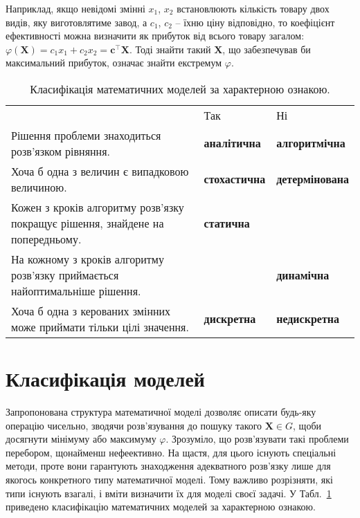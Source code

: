 \documentclass[../book.tex]{subfiles}
\begin{document}
Наприклад, якщо невідомі змінні $x_1$, $x_2$ встановлюють кількість товару двох видів, яку виготовлятиме завод, а $c_1$, $c_2$ -- їхню ціну відповідно, то коефіцієнт ефективності можна визначити як прибуток від всього товару загалом: ${\varphi(\mathbf{X})} = {c_1 x_1} + {c_2 x_2} = \mathbf{c}^\top \mathbf{X}$. Тоді знайти такий $\mathbf{X}$, що забезпечував би максимальний прибуток, означає знайти екстремум $\varphi$.

\begin{table}[t]
\centering
\begin{tabular}{p{5.5cm}|ll}
 \hline
 & Так & Ні \\
 Рішення проблеми знаходиться розв'язком рівняння. & \textbf{аналітична} & \textbf{алгоритмічна} \\
 Хоча б одна з величин є випадковою величиною. & \textbf{стохастична} & \textbf{детермінована} \\
 Кожен з кроків алгоритму розв'язку покращує рішення, знайдене на попередньому. & \textbf{статична} & \\
 На кожному з кроків алгоритму розв'язку приймається найоптимальніше рішення. & & \textbf{динамічна} \\
 Хоча б одна з керованих змінних може приймати тільки цілі значення. & \textbf{дискретна} & \textbf{недискретна} \\
 \hline
\end{tabular}
\caption{Класифікація математичних моделей за характерною ознакою.}
\label{tab:intro:math_models}
\end{table}

\section{Класифікація моделей}

Запропонована структура математичної моделі дозволяє описати будь-яку операцію чисельно, зводячи розв'язування до пошуку такого ${\mathbf{X} \in G}$, щоби досягнути мінімуму або максимуму $\varphi$. Зрозуміло, що роз\-в'яз\-ува\-ти такі проблеми перебором, щонайменш нефеективно. На щастя, для цього існують спеціальні методи, проте вони гарантують знаходження адекватного розв'язку лише для якогось конкретного типу математичної моделі. Тому важливо розрізняти, які типи існують взагалі, і вміти визначити їх для моделі своєї задачі. У Табл.~\ref{tab:intro:math_models} приведено класифікацію математичних моделей за характерною ознакою.
\end{document}
